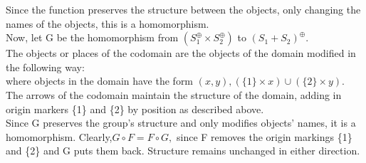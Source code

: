 Since the function preserves the structure between the objects, only changing the names of the objects, this is a homomorphism.\\
Now, let G be the homomorphism from $(S_1 ^\oplus \times S_2 ^\oplus)$ to $(S_1 + S_2)^\oplus$. \\
The objects or places of the codomain are the objects of the domain modified in the following way:\\
where objects in the domain have the form $(x, y), (\{1\} \times x) \cup (\{2\} \times y).$\\
The arrows of the codomain maintain the structure of the domain, adding in origin markers \{1\} and \{2\} by position as described above.\\
Since G preserves the group's structure and only modifies objects' names, it is a homomorphism. 
Clearly,$ G \circ F = F \circ G,$ since F removes the origin markings  \{1\} and \{2\} and G puts them back. Structure remains unchanged in either direction.\\
\newpage



\cite{Benton:2018:SEC:3236950.3236975}
